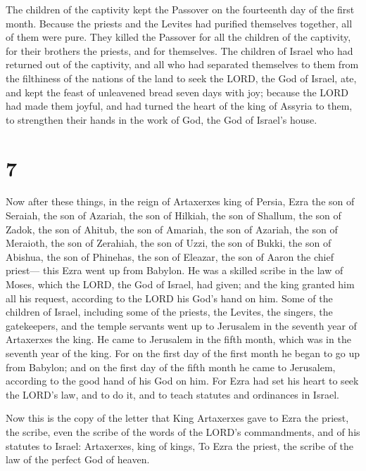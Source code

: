  The children of the captivity kept the Passover on the
fourteenth day of the first month.  Because the priests and
the Levites had purified themselves together, all of them were pure.
They killed the Passover for all the children of the captivity, for
their brothers the priests, and for themselves.  The
children of Israel who had returned out of the captivity, and all who
had separated themselves to them from the filthiness of the nations of
the land to seek the LORD, the God of Israel, ate,  and
kept the feast of unleavened bread seven days with joy; because the LORD
had made them joyful, and had turned the heart of the king of Assyria to
them, to strengthen their hands in the work of God, the God of Israel's
house.

\hypertarget{section-6}{%
\section{7}\label{section-6}}

 Now after these things, in the reign of Artaxerxes king of
Persia, Ezra the son of Seraiah, the son of Azariah, the son of Hilkiah,
 the son of Shallum, the son of Zadok, the son of Ahitub,
 the son of Amariah, the son of Azariah, the son of
Meraioth,  the son of Zerahiah, the son of Uzzi, the son of
Bukki,  the son of Abishua, the son of Phinehas, the son of
Eleazar, the son of Aaron the chief priest---  this Ezra
went up from Babylon. He was a skilled scribe in the law of Moses, which
the LORD, the God of Israel, had given; and the king granted him all his
request, according to the LORD his God's hand on him.  Some
of the children of Israel, including some of the priests, the Levites,
the singers, the gatekeepers, and the temple servants went up to
Jerusalem in the seventh year of Artaxerxes the king.  He
came to Jerusalem in the fifth month, which was in the seventh year of
the king.  For on the first day of the first month he began
to go up from Babylon; and on the first day of the fifth month he came
to Jerusalem, according to the good hand of his God on him.
 For Ezra had set his heart to seek the LORD's law, and to
do it, and to teach statutes and ordinances in Israel.

 Now this is the copy of the letter that King Artaxerxes
gave to Ezra the priest, the scribe, even the scribe of the words of the
LORD's commandments, and of his statutes to Israel: 
Artaxerxes, king of kings, To Ezra the priest, the scribe of the law of
the perfect God of heaven.

